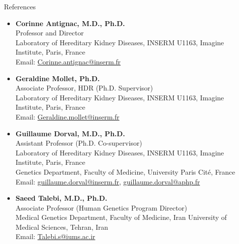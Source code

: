 \documentclass[
	11pt, %
]{resume} %
\begin{document}
\begin{rSection}{References}

\begin{itemize}
  \item \textbf{Corinne Antignac, M.D., Ph.D.} \\
  Professor and Director \\
  Laboratory of Hereditary Kidney Diseases, INSERM U1163, Imagine Institute, Paris, France \\
  Email: \href{mailto:Corinne.antignac@inserm.fr}{Corinne.antignac@inserm.fr}

  \item \textbf{Geraldine Mollet, Ph.D.} \\
  Associate Professor, HDR (Ph.D. Supervisor) \\
  Laboratory of Hereditary Kidney Diseases, INSERM U1163, Imagine Institute, Paris, France \\
  Email: \href{mailto:Geraldine.mollet@inserm.fr}{Geraldine.mollet@inserm.fr}

  \item \textbf{Guillaume Dorval, M.D., Ph.D.} \\
  Assistant Professor (Ph.D. Co-supervisor) \\
  Laboratory of Hereditary Kidney Diseases, INSERM U1163, Imagine Institute, Paris, France \\
  Genetics Department, Faculty of Medicine, University Paris Cité, France \\
  Email: \href{mailto:guillaume.dorval@inserm.fr}{guillaume.dorval@inserm.fr}, 
  \href{mailto:guillaume.dorval@aphp.fr}{guillaume.dorval@aphp.fr}

  \item \textbf{Saeed Talebi, M.D., Ph.D.} \\
  Associate Professor (Human Genetics Program Director) \\
  Medical Genetics Department, Faculty of Medicine, Iran University of Medical Sciences, Tehran, Iran \\
  Email: \href{mailto:Talebi.s@iums.ac.ir}{Talebi.s@iums.ac.ir}
\end{itemize}

\end{rSection}

\end{document}
